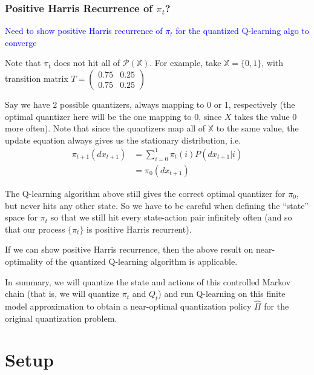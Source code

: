 \documentclass{article}
\begin{document}
\subsubsection{Positive Harris Recurrence of \( \pi_t \)?}
\textcolor{blue}{Need to show positive Harris recurrence of \( \pi_t \) for the quantized Q-learning algo to converge}

Note that \( \pi_t \) does not hit all of \( \mathcal{P}(\mathbb{X}) \). For example, take \( \mathbb{X} = \{0, 1\} \), with transition matrix \( T = \begin{pmatrix}
    0.75 & 0.25 \\
    0.75 & 0.25
\end{pmatrix}
\)

Say we have 2 possible quantizers, always mapping to 0 or 1, respectively (the optimal quantizer here will be the one mapping to 0, since \( X \) takes the value 0 more often). Note that since the quantizers map all of \( \mathbb{X} \) to the same value, the update equation always gives us the stationary distribution, i.e.
\begin{equation*}
    \begin{split}
        \pi_{t+1}(dx_{t+1}) & = \sum_{i=0}^1\pi_t(i)P(dx_{t+1}|i) \\
        & = \pi_0(dx_{t+1})
    \end{split}
\end{equation*}

The Q-learning algorithm above still gives the correct optimal quantizer for \( \pi_0 \), but never hits any other state. So we have to be careful when defining the ``state'' space for \( \pi_t \)  so that we still hit every state-action pair infinitely often (and so that our process \( \{\pi_t\} \) is positive Harris recurrent).

If we can show positive Harris recurrence, then the above result on near-optimality of the quantized Q-learning algorithm is applicable.

In summary, we will quantize the state and actions of this controlled Markov chain (that is, we will quantize \( \pi_t \) and \( Q_t \)) and run Q-learning on this finite model approximation to obtain a near-optimal quantization policy \( \hat{\Pi} \) for the original quantization problem.


\section{Setup}
\end{document}
